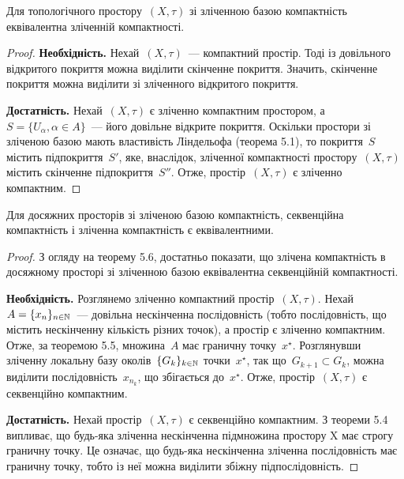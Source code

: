 \begin{theorem}
    Для топологічного простору~$(X, \tau)$ зі зліченною базою компактність еквівалентна зліченній компактності.
\end{theorem}

\begin{proof}
    \textbf{Необхідність.} Нехай~$(X, \tau)$~--- компактний простір. Тоді із довільного відкритого покриття можна виділити скінченне покриття. Значить, скінченне покриття можна виділити зі зліченного відкритого покриття.

    \textbf{Достатність.} Нехай~$(X, \tau)$ є зліченно компактним простором, а~$S = \{U_\alpha, \alpha \in A\}$~--- його довільне відкрите покриття. Оскільки простори зі зліченою базою мають властивість Ліндельофа (теорема 5.1), то покриття~$S$ містить підпокриття~$S'$, яке, внаслідок, зліченної компактності простору~$(X, \tau)$ містить скінченне підпокриття~$S''$. Отже, простір~$(X, \tau)$ є зліченно компактним.
\end{proof}

\begin{theorem}
    Для досяжних просторів зі зліченою базою компактність, секвенційна компактність і зліченна компактність є еквівалентними.
\end{theorem}

\begin{proof}
    З огляду на \error теорему 5.6, достатньо показати, що злічена компактність в досяжному просторі зі зліченною базою еквівалентна секвенційній компактності.

    \textbf{Необхідність.} Розглянемо зліченно компактний простір~$(X, \tau)$. Нехай~$A = \{x_n\}_{n \in \mathbb{N}}$~--- довільна нескінченна послідовність (тобто послідовність, що містить нескінченну кількість різних точок), а простір є зліченно компактним. Отже, за теоремою 5.5, множина~$A$ має граничну точку~$x^\star$. Розглянувши зліченну локальну базу околів~$\{G_k\}_{k \in \mathbb{N}}$ точки~$x^\star$, так що~$G_{k + 1} \subset G_k$, можна виділити послідовність~$x_{n_k}$, що збігається до~$x^\star$. Отже, простір~$(X, \tau)$ є секвенційно компактним.

    \textbf{Достатність.} Нехай простір~$(X, \tau)$ є секвенційно компактним. З \error теореми 5.4 випливає, що будь-яка зліченна нескінченна підмножина простору X має строгу граничну точку. Це означає, що будь-яка нескінченна зліченна послідовність має граничну точку, тобто із неї можна виділити збіжну підпослідовність.
\end{proof}

